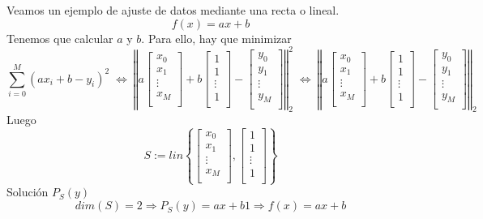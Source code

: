 \begin{ejemplo}
Veamos un ejemplo de ajuste de datos mediante una recta o lineal.
\[ f(x) = ax+b \]
Tenemos que calcular $a$ y $b$. Para ello, hay que minimizar
\[ \sum_{i=0}^M (ax_i + b - y_i)^2 
\; \Leftrightarrow \;
\left\Vert a \begin{bmatrix}
x_0 \\
x_1 \\
\vdots \\
x_M\\
\end{bmatrix}
+ b \begin{bmatrix}
1 \\
1 \\
\vdots \\
1 \\
\end{bmatrix}
- \begin{bmatrix}
y_0 \\
y_1 \\
\vdots \\
y_M \\
\end{bmatrix}
\right\Vert _2^2
\; \Leftrightarrow \; 
\left\Vert a \begin{bmatrix}
x_0 \\
x_1 \\
\vdots \\
x_M\\
\end{bmatrix}
+ b \begin{bmatrix}
1 \\
1 \\
\vdots \\
1 \\
\end{bmatrix}
- \begin{bmatrix}
y_0 \\
y_1 \\
\vdots \\
y_M \\
\end{bmatrix}
\right\Vert _2
\]
Luego
\[ S:= lin \left\lbrace \begin{bmatrix}
x_0 \\
x_1 \\
\vdots \\
x_M \\
\end{bmatrix}
, \begin{bmatrix}
1 \\
1 \\
\vdots \\
1 \\
\end{bmatrix}
\right\rbrace \]
Solución $P_S(y)$
\[ dim(S) = 2 \Rightarrow P_S(y) = ax + b1 \Rightarrow f(x) = ax+b \]
\end{ejemplo}

